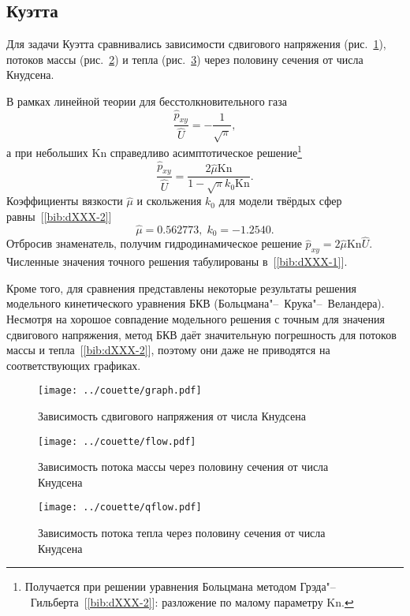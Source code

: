 \documentclass[english,russian,a4paper,12pt]{article}
\newcommand{\Kn}{\mathrm{Kn}}
\begin{document}
\section*{}

\subsection*{ Куэтта}

Для задачи Куэтта сравнивались зависимости сдвигового напряжения (рис.~\ref{fig:couette:shear}),
потоков массы (рис.~\ref{fig:couette:flow}) и тепла (рис.~\ref{fig:couette:qflow})
через половину сечения от числа Кнудсена.

В рамках линейной теории для бесстолкновительного газа
\[ \frac{\hat{p}_{xy}}{\hat{U}} = -\frac1{\sqrt{\pi}}, \]
а при небольших \(\Kn\) справедливо асимптотическое решение\footnote
{ Получается при решении уравнения Больцмана методом Грэда"--~Гильберта~[\ref{bib:dXXX-2}]: разложение по малому параметру \(\Kn\). }
\[ \frac{\hat{p}_{xy}}{\hat{U}} = \frac{2\hat{\mu}\Kn}{1-\sqrt{\pi}k_0\Kn}. \]
Коэффициенты вязкости \(\hat{\mu}\) и скольжения \(k_0\) для модели твёрдых сфер равны~[\ref{bib:dXXX-2}]
\[ \hat{\mu} = 0.562773, \; k_0 = -1.2540. \]
Отбросив знаменатель, получим гидродинамическое решение \(\hat{p}_{xy} = 2\hat{\mu}\Kn\hat{U}\).
Численные значения точного решения табулированы в~[\ref{bib:dXXX-1}].

Кроме того, для сравнения представлены некоторые результаты 
решения модельного кинетического уравнения БКВ (Больцмана"--~Крука"--~Веландера).
Несмотря на хорошое совпадение модельного решения с точным для значения сдвигового напряжения,
метод БКВ даёт значительную погрешность для потоков массы и тепла~[\ref{bib:dXXX-2}],
поэтому они даже не приводятся на соответствующих графиках.

\begin{figure}
	\centering
	\texttt{[image: ../couette/graph.pdf]}
	\caption{Зависимость сдвигового напряжения от числа Кнудсена}\label{fig:couette:shear}
\end{figure}

\begin{figure}
	\centering
	\texttt{[image: ../couette/flow.pdf]}
	\caption{Зависимость потока массы через половину сечения от числа Кнудсена}\label{fig:couette:flow}
\end{figure}

\begin{figure}
	\centering
	\texttt{[image: ../couette/qflow.pdf]}
	\caption{Зависимость потока тепла через половину сечения от числа Кнудсена}\label{fig:couette:qflow}
\end{figure}
\end{document}
